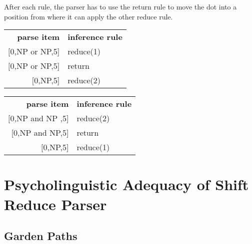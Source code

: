 \begin{examplebox}
    After each rule, the parser has to use the return rule to move the dot into a position from where it can apply the other reduce rule.
    \begin{center}
        \begin{tabular}{r|l}
            \textbf{parse item} & \textbf{inference rule}\\
            $\lbrack$0,NP \psep or NP,5] & reduce(1)\\
            $\lbrack$0,\psep NP or NP,5] & return\\
            $\lbrack$0,NP,5] & reduce(2)\\
        \end{tabular}
        \hspace{1em}
        \begin{tabular}{r|l}
            \textbf{parse item} & \textbf{inference rule}\\
            $\lbrack$0,NP and NP \psep,5] & reduce(2) \\
            $\lbrack$0,\psep NP and NP,5] & return\\
            $\lbrack$0,NP,5] & reduce(1)\\
        \end{tabular}
    \end{center}
\end{examplebox}

\section{Psycholinguistic Adequacy of Shift Reduce Parser}
\label{sec:BottomUp_Evaluation}

\subsection{Garden Paths}
\label{sub:BottomUp_GardenPaths}

